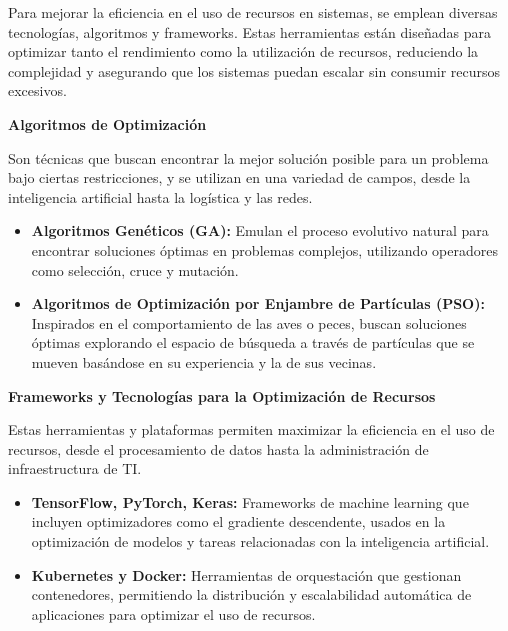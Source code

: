 \documentclass[14pt]{extarticle}
\begin{document}
\begin{enumerate}
    \vspace{0.3cm}
    Para mejorar la eficiencia en el uso de recursos en sistemas, se emplean diversas tecnologías, algoritmos y frameworks. Estas herramientas están diseñadas para optimizar tanto el rendimiento como la utilización de recursos, reduciendo la complejidad y asegurando que los sistemas puedan escalar sin consumir recursos excesivos.

    \vspace{0.3cm}
    \textbf{Algoritmos de Optimización}
    
    Son técnicas que buscan encontrar la mejor solución posible para un problema bajo ciertas restricciones, y se utilizan en una variedad de campos, desde la inteligencia artificial hasta la logística y las redes.

    \begin{itemize}
      \item \textbf{Algoritmos Genéticos (GA):} Emulan el proceso evolutivo natural para encontrar soluciones óptimas en problemas complejos, utilizando operadores como selección, cruce y mutación.

      \item \textbf{Algoritmos de Optimización por Enjambre de Partículas (PSO):} Inspirados en el comportamiento de las aves o peces, buscan soluciones óptimas explorando el espacio de búsqueda a través de partículas que se mueven basándose en su experiencia y la de sus vecinas.
    \end{itemize}

    \vspace{0.3cm}
    \textbf{Frameworks y Tecnologías para la Optimización de Recursos}
    
    Estas herramientas y plataformas permiten maximizar la eficiencia en el uso de recursos, desde el procesamiento de datos hasta la administración de infraestructura de TI.

    \begin{itemize}
      \item \textbf{TensorFlow, PyTorch, Keras:} Frameworks de machine learning que incluyen optimizadores como el gradiente descendente, usados en la optimización de modelos y tareas relacionadas con la inteligencia artificial.

      \item \textbf{Kubernetes y Docker:} Herramientas de orquestación que gestionan contenedores, permitiendo la distribución y escalabilidad automática de aplicaciones para optimizar el uso de recursos.
    \end{itemize}


\end{enumerate}
\end{document}
